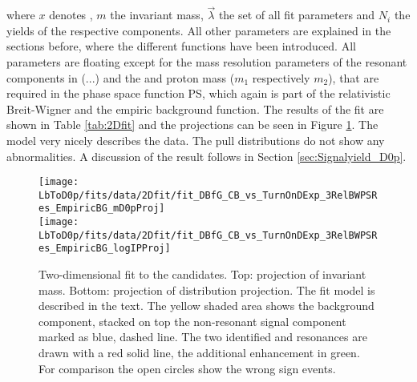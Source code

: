 where $x$ denotes \logIP, $m$ the invariant \Dz\proton mass, $\vec{\lambda}$ the set of all fit parameters and $N_i$ the yields of the respective components.
All other parameters are explained in the sections before, where the different functions have been introduced.
All parameters are floating except for the mass resolution parameters of the resonant components in \RES(...) and the \Dz and proton mass ($m_1$ respectively $m_2$), that are required in the phase space function PS, which again is part of the relativistic Breit-Wigner and the empiric background function. 
The results of the fit are shown in Table \ref{tab:2Dfit} and the projections can be seen in Figure \ref{fig:fit2D}.
The model very nicely describes the data.
The pull distributions do not show any abnormalities.
A discussion of the result follows in Section \ref{sec:Signalyield_D0p}.
\begin{figure}[tbp]
	\centering
	\texttt{[image: LbToD0p/fits/data/2Dfit/fit\_DBfG\_CB\_vs\_TurnOnDExp\_3RelBWPSRes\_EmpiricBG\_mD0pProj]} \\
	\texttt{[image: LbToD0p/fits/data/2Dfit/fit\_DBfG\_CB\_vs\_TurnOnDExp\_3RelBWPSRes\_EmpiricBG\_logIPProj]}
	\caption{Two-dimensional fit to the \LbToDpmunuX candidates. Top: projection of invariant \Dz\proton mass. Bottom: projection of \logIP distribution projection.
             The fit model is described in the text.
             The yellow shaded area shows the background component, stacked on top the non-resonant signal component marked as blue, dashed line.
             The two identified \LcResI and \LcResII resonances are drawn with a red solid line, the additional enhancement in green.
             For comparison the open circles show the wrong sign events.}
	\label{fig:fit2D}
\end{figure}


